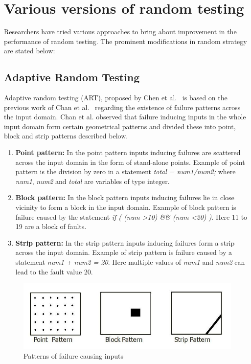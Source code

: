 \section{Various versions of random testing}
Researchers have tried various approaches to bring about improvement in the performance of random testing. The prominent modifications in random strategy are stated below:

\subsection{Adaptive Random Testing}
Adaptive random testing (ART), proposed by Chen et al.~\cite{Chen2008} is based on the previous work of Chan et al.~\cite{Chan1996} regarding the existence of failure patterns across the input domain. Chan et al. observed that failure inducing inputs in the whole input domain form certain geometrical patterns and divided these into point, block and strip patterns described below.

\begin{enumerate}
\item {\bf Point pattern:} In the point pattern inputs inducing failures are scattered across the input domain in the form of stand-alone points. Example of point pattern is the division by zero in a statement {\it total = num1/num2;} where {\it num1}, {\it num2} and {\it total} are variables of type integer.
\item {\bf Block pattern:} In the block pattern inputs inducing failures lie in close vicinity to form a block in the input domain. Example of block pattern is failure caused by the statement {\it if ( (num \textgreater 10) \&\& (num \textless 20) )}. Here 11 to 19 are a block of faults.
\item {\bf Strip pattern:} In the strip pattern inputs inducing failures form a strip across the input domain. Example of strip pattern is failure caused by a statement {\it num1 + num2 = 20}. Here multiple values of {\it num1} and {\it num2} can lead to the fault value 20. 
\end{enumerate}

\begin{figure}[h]
	\centering
	\includegraphics[scale=0.5]{chapter3/pointblockstrip.jpg}
	\caption{Patterns of failure causing inputs}
	\label{fig:patterns2}
\end{figure}

